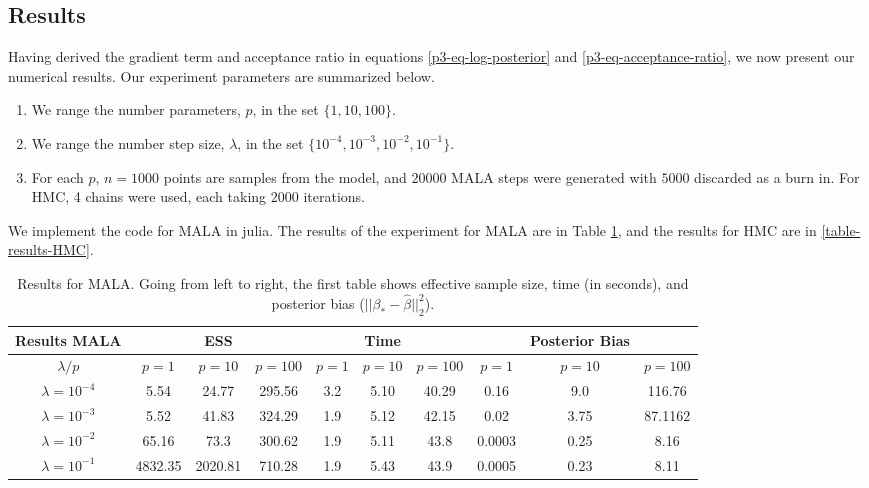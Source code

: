 \documentclass{article}
\begin{document}
\subsection{Results}
Having derived the gradient term and acceptance ratio in equations \ref{p3-eq-log-posterior} and \ref{p3-eq-acceptance-ratio}, 
we now present our numerical results.
Our experiment parameters are summarized below.
\begin{enumerate}
    \item We range the number parameters, $p$, in the set $\{1, 10, 100\}$.
    \item We range the number step size, $\lambda$, in the set $\{10^{-4}, 10^{-3}, 10^{-2}, 10^{-1}\}$.
    \item For each $p$, $n=1000$ points are samples from the model, and $20000$ MALA steps were generated with $5000$ discarded as a burn in. 
    For HMC, 4 chains were used, each taking $2000$ iterations. 
\end{enumerate}
We implement the code for MALA in julia. The results of the experiment for MALA are in Table \ref{table-results-mala}, and the results for HMC are in \ref{table-results-HMC}.
\begin{table}[ht]
    \centering
    \caption{Results for MALA. Going from left to right, the first table shows effective sample size, time (in seconds), and posterior bias ($||\beta_* - \hat{\beta}||_2^2$).}
    \label{table-results-mala}
    \footnotesize
    \begin{tabular}{| c | c c c || c c c || c c c |} \toprule
    Results MALA                    & & ESS &  &  & Time &  & & Posterior Bias &  \\ \midrule
    $\lambda / p$                    & $p=1$ & $p = 10$ & $p = 100$ & $p=1$ & $p = 10$ & $p = 100$ & $p=1$ & $p = 10$ & $p = 100$ \\ \midrule 
    $\lambda = 10^{-4}$   &  5.54     &    24.77      &     295.56      &   3.2   &   5.10    &    40.29  &     0.16     &    9.0      &  116.76 \\
    $\lambda = 10^{-3}$   &  5.52    &    41.83      &    324.29      &   1.9    &  5.12     &   42.15  &     0.02     &      3.75    & 87.1162\\
    $\lambda = 10^{-2}$   &  65.16     &  73.3       &    300.62       &   1.9    &  5.11     &   43.8   &     0.0003      &    0.25      & 8.16\\
    $\lambda = 10^{-1}$   &  4832.35    &  2020.81        &   710.28        &   1.9    &  5.43     &   43.9   &     0.0005      &    0.23      & 8.11 \\\bottomrule
    \end{tabular}
\end{table}
\end{document}
